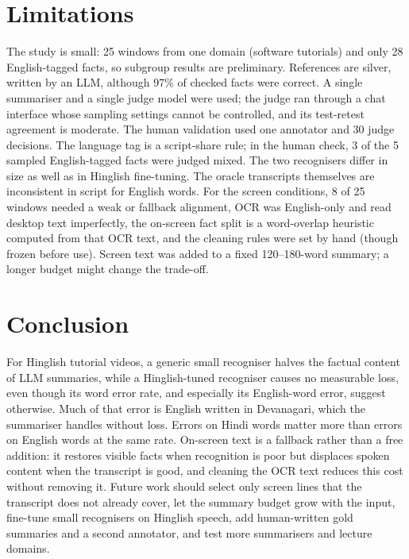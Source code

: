 \documentclass[conference]{IEEEtran}
\begin{document}
\section{Limitations}
The study is small: 25 windows from one domain (software tutorials) and only 28 English-tagged facts, so subgroup results are preliminary. References are silver, written by an LLM, although 97\% of checked facts were correct. A single summariser and a single judge model were used; the judge ran through a chat interface whose sampling settings cannot be controlled, and its test-retest agreement is moderate. The human validation used one annotator and 30 judge decisions. The language tag is a script-share rule; in the human check, 3 of the 5 sampled English-tagged facts were judged mixed. The two recognisers differ in size as well as in Hinglish fine-tuning. The oracle transcripts themselves are inconsistent in script for English words. For the screen conditions, 8 of 25 windows needed a weak or fallback alignment, OCR was English-only and read desktop text imperfectly, the on-screen fact split is a word-overlap heuristic computed from that OCR text, and the cleaning rules were set by hand (though frozen before use). Screen text was added to a fixed 120--180-word summary; a longer budget might change the trade-off.

\section{Conclusion}
For Hinglish tutorial videos, a generic small recogniser halves the factual content of LLM summaries, while a Hinglish-tuned recogniser causes no measurable loss, even though its word error rate, and especially its English-word error, suggest otherwise. Much of that error is English written in Devanagari, which the summariser handles without loss. Errors on Hindi words matter more than errors on English words at the same rate. On-screen text is a fallback rather than a free addition: it restores visible facts when recognition is poor but displaces spoken content when the transcript is good, and cleaning the OCR text reduces this cost without removing it. Future work should select only screen lines that the transcript does not already cover, let the summary budget grow with the input, fine-tune small recognisers on Hinglish speech, add human-written gold summaries and a second annotator, and test more summarisers and lecture domains.

\end{document}
